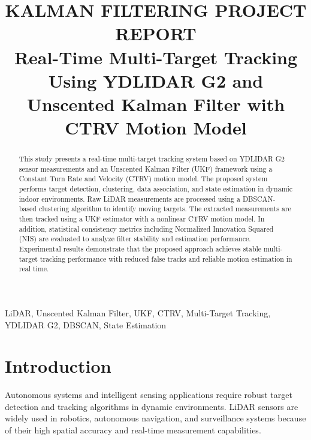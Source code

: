 \documentclass[conference]{IEEEtran}
\begin{document}
\title{KALMAN FILTERING PROJECT REPORT\\Real-Time Multi-Target Tracking Using YDLIDAR G2 and Unscented Kalman Filter with CTRV Motion Model}

\author{
\and
{}
\and
{}
}

\maketitle

\begin{abstract}
This study presents a real-time multi-target tracking system based on YDLIDAR G2 sensor measurements and an Unscented Kalman Filter (UKF) framework using a Constant Turn Rate and Velocity (CTRV) motion model. The proposed system performs target detection, clustering, data association, and state estimation in dynamic indoor environments. Raw LiDAR measurements are processed using a DBSCAN-based clustering algorithm to identify moving targets. The extracted measurements are then tracked using a UKF estimator with a nonlinear CTRV motion model. In addition, statistical consistency metrics including Normalized Innovation Squared (NIS) are evaluated to analyze filter stability and estimation performance. Experimental results demonstrate that the proposed approach achieves stable multi-target tracking performance with reduced false tracks and reliable motion estimation in real time.
\end{abstract}

\begin{IEEEkeywords}
LiDAR, Unscented Kalman Filter, UKF, CTRV, Multi-Target Tracking, YDLIDAR G2, DBSCAN, State Estimation
\end{IEEEkeywords}

\section{Introduction}
Autonomous systems and intelligent sensing applications require robust target detection and tracking algorithms in dynamic environments. LiDAR sensors are widely used in robotics, autonomous navigation, and surveillance systems because of their high spatial accuracy and real-time measurement capabilities.
\end{document}
